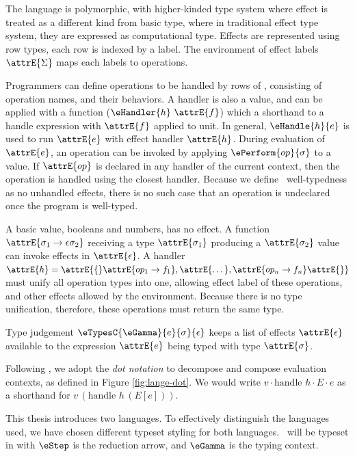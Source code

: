 The language is polymorphic, with higher-kinded type system where effect is
treated as a different kind from basic type, where in traditional effect type
system, they are expressed as computational type. Effects are represented using
row types, each row is indexed by a label. The environment of effect labels
$\attrE{\Sigma}$ maps each labels to operations.

Programmers can define operations to be handled by rows of , consisting of operation names, and their behaviors. A handler is also a value, and can be applied with a function ($\eHandler{h} \ \attrE{f}$) which a shorthand to a handle expression with $\attrE{f}$ applied to unit. In general, $\eHandle{h}{e}$ is used to run $\attrE{e}$ with effect handler $\attrE{h}$. During evaluation of $\attrE{e}$, an operation can be invoked by applying $\ePerform{op}{\sigma}$ to a value. If $\attrE{op}$ is declared in any handler of the current context, then the operation is handled using the closest handler. Because we define \lange\ well-typedness as no unhandled effects, there is no such case that an operation is undeclared once the program is well-typed.

A basic value, booleans and numbers, has no effect. A function $\attrE{\sigma_1\to\epsilon\sigma_2}$ receiving a type $\attrE{\sigma_1}$ producing a $\attrE{\sigma_2}$ value can invoke effects in $\attrE{\epsilon}$. A handler $\attrE{h} = \attrE{\{} \attrE{op_1 \to f_1}, \attrE{\dots}, \attrE{op_n \to f_n} \attrE{\}}$ must unify all operation types into one, allowing effect label of these operations, and other effects allowed by the environment. Because there is no type unification, therefore, these operations must return the same type.

Type judgement $\eTypesC{\eGamma}{e}{\sigma}{\epsilon}$ keeps a list of effects $\attrE{\epsilon}$ available to the expression $\attrE{e}$ being typed with type $\attrE{\sigma}$.

Following \cite{xie2020effect}, we adopt the \textit{dot notation} to decompose and compose evaluation contexts, as defined in Figure \ref{fig:lange-dot}. We would write $v \cdot \text{handle } h \cdot E \cdot e$ as a shorthand for $v \, (\text{handle } h \, (E[e]))$.

This thesis introduces two languages. To effectively distinguish the languages
used, we have chosen different typeset styling for both languages. \lange\ will
be typeset in  with  $\eStep$ is the reduction arrow, and
$\eGamma$ is the typing context.

